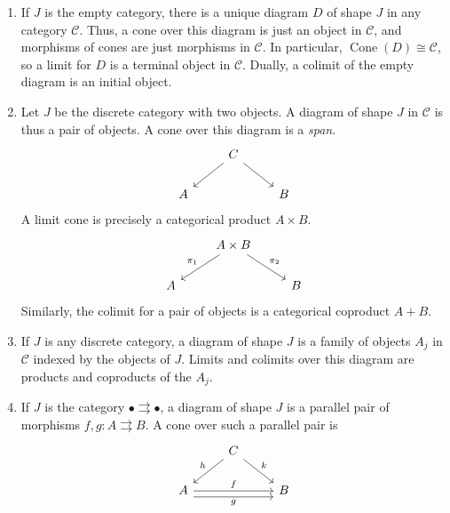 \begin{example}
    \begin{enumerate}
        \item If \( J \) is the empty category, there is a unique diagram \( D \) of shape \( J \) in any category \( \mathcal C \).
        Thus, a cone over this diagram is just an object in \( \mathcal C \), and morphisms of cones are just morphisms in \( \mathcal C \).
        In particular, \( \operatorname{Cone}(D) \cong \mathcal C \), so a limit for \( D \) is a terminal object in \( \mathcal C \).
        Dually, a colimit of the empty diagram is an initial object.
        \item Let \( J \) be the discrete category with two objects.
        A diagram of shape \( J \) in \( \mathcal C \) is thus a pair of objects.
        A cone over this diagram is a \emph{span}.
        \[\begin{tikzcd}
            & C \\
            A && B
            \arrow[from=1-2, to=2-1]
            \arrow[from=1-2, to=2-3]
        \end{tikzcd}\]
        A limit cone is precisely a categorical product \( A \times B \).
        \[\begin{tikzcd}
            & {A \times B} \\
            A && B
            \arrow["{\pi_1}"', from=1-2, to=2-1]
            \arrow["{\pi_2}", from=1-2, to=2-3]
        \end{tikzcd}\]
        Similarly, the colimit for a pair of objects is a categorical coproduct \( A + B \).
        \item If \( J \) is any discrete category, a diagram of shape \( J \) is a family of objects \( A_j \) in \( \mathcal C \) indexed by the objects of \( J \).
        Limits and colimits over this diagram are products and coproducts of the \( A_j \).
        \item If \( J \) is the category \( \bullet \rightrightarrows \bullet \), a diagram of shape \( J \) is a parallel pair of morphisms \( f, g : A \rightrightarrows B \).
        A cone over such a parallel pair is
\[\begin{tikzcd}
	& C \\
	A && B
	\arrow["h"', from=1-2, to=2-1]
	\arrow["k", from=1-2, to=2-3]
	\arrow["f", from=2-1, to=2-3]
	\arrow["g"', shift right=2, from=2-1, to=2-3]

\end{tikzcd}\]
\end{enumerate}
\end{example}
